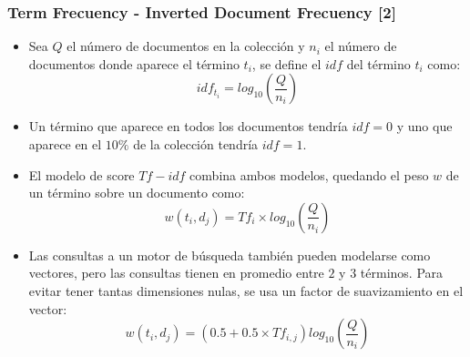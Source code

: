 \documentclass[mathserif]{beamer}
\begin{document}
\begin{frame}\frametitle{Term Frecuency - Inverted Document Frecuency [2]}
\footnotesize{ 
\begin{itemize}
 \item Sea $Q$ el número de documentos en la colección y $n_{i}$ el número de documentos donde aparece el término $t_{i}$, se define el $idf$ del término $t_{i}$ como: 
 \begin{displaymath}
  idf_{t_{i}}= log_{10}(\frac{Q}{n_{i}})
 \end{displaymath}
\item Un término que aparece en todos los documentos tendría $idf=0$ y uno que aparece en el $10\%$ de la colección tendría $idf=1$.

\item El modelo de score $Tf-idf$ combina ambos modelos, quedando el peso $w$ de un término sobre un documento como:
\begin{displaymath}
w(t_{i},d_{j})=Tf_{i}\times log_{10}(\frac{Q}{n_{i}}) 
\end{displaymath}

\item Las consultas a un motor de búsqueda también pueden modelarse como vectores, pero las consultas tienen en promedio entre $2$ y $3$ términos. Para evitar tener tantas dimensiones nulas, se usa un factor de suavizamiento en el vector:
\begin{displaymath}
 w(t_{i},d_{j})=(0.5+0.5\times Tf_{i,j})log_{10}(\frac{Q}{n_{i}}) 
\end{displaymath}



\end{itemize}



}

\end{frame}
\end{document}
